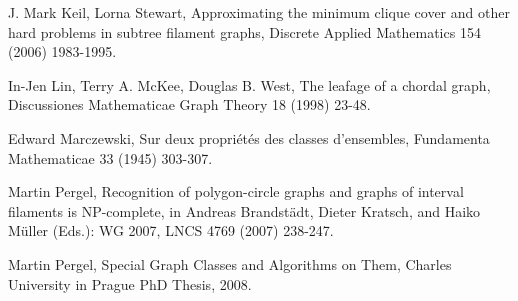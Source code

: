 \documentclass[
final
]{dmtcs-episciences}        \usepackage{graphics, amsthm, amsmath, amssymb, algorithm, algorithmic}
\begin{document}
\begin{thebibliography}{99}
J. Mark Keil, Lorna Stewart, Approximating the minimum clique cover
and other hard problems in subtree filament graphs, Discrete Applied
Mathematics 154 (2006) 1983-1995.

In-Jen Lin, Terry A. McKee, Douglas B. West,
The leafage of a chordal graph,
Discussiones Mathematicae Graph Theory 18 (1998) 23-48.

Edward Marczewski,
Sur deux propri\'et\'es des classes d'ensembles, Fundamenta Mathematicae 33 (1945) 303-307.

Martin Pergel, Recognition of polygon-circle graphs and graphs of interval filaments is NP-complete, in Andreas Brandst\"adt, Dieter Kratsch, and Haiko M\"uller (Eds.): WG 2007, LNCS 4769 (2007) 238-247.

Martin Pergel, 
Special Graph Classes and Algorithms on Them, Charles University in Prague PhD Thesis, 2008.

\end{thebibliography}
\end{document}
